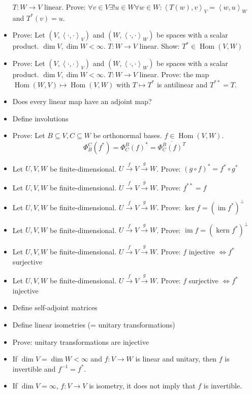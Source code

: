 \documentclass[a4paper]{article}
\newcommand{\ip}[2]{\left\langle#1,#2\right\rangle} %
\DeclareMathOperator{\im}{im}
\DeclareMathOperator{\ke}{kern}
\begin{document}
\begin{itemize}
    $T: W \to V$ linear. Prove: $\forall v \in V \exists! u \in W \forall w \in W: \ip{T(w)}{v}_V = \ip{w}{u}_W$ and $T^*(v) = u$.
  \item Prove: Let $(V, \ip{\cdot}{\cdot}_V)$ and $(W, \ip{\cdot}{\cdot}_W)$ be spaces with a scalar product. $\dim{V}, \dim{W} < \infty$.
    $T: W \to V$ linear. Show: $T^* \in \operatorname{Hom}(V, W)$
  \item Prove: Let $(V, \ip{\cdot}{\cdot}_V)$ and $(W, \ip{\cdot}{\cdot}_W)$ be spaces with a scalar product. $\dim{V}, \dim{W} < \infty$.
    $T: W \to V$ linear. Prove: the map $\operatorname{Hom}(W, V) \mapsto \operatorname{Hom}(V, W)$ with $T \mapsto T^*$ is antilinear and $T^{**} = T$.
  \item Does every linear map have an adjoint map?
  \item Define involutions
  \item Prove: Let $B \subseteq V, C \subseteq W$ be orthonormal bases. $f \in \operatorname{Hom}(V, W)$.
    \[ \Phi_B^C(f^*) = \Phi_C^B(f)^* = \overline{\Phi_C^B(f)^T} \]
  \item Let $U, V, W$ be finite-dimensional. $U \xrightarrow f V \xrightarrow g W$. Prove: $(g \circ f)^* = f^* \circ g^*$
  \item Let $U, V, W$ be finite-dimensional. $U \xrightarrow f V \xrightarrow g W$. Prove: $f^{**} = f$
  \item Let $U, V, W$ be finite-dimensional. $U \xrightarrow f V \xrightarrow g W$. Prove: $\ker{f} = (\im{f^*})^\bot$
  \item Let $U, V, W$ be finite-dimensional. $U \xrightarrow f V \xrightarrow g W$. Prove: $\im{f} = (\ke{f^*})^\bot$
  \item Let $U, V, W$ be finite-dimensional. $U \xrightarrow f V \xrightarrow g W$. Prove: $f$ injective $\iff f^*$ surjective
  \item Let $U, V, W$ be finite-dimensional. $U \xrightarrow f V \xrightarrow g W$. Prove: $f$ surjective $\iff f^*$ injective
  \item Define self-adjoint matrices
  \item Define linear isometries (= unitary transformations)
  \item Prove: unitary transformations are injective
  \item If $\dim{V} = \dim{W} < \infty$ and $f: V \to W$ is linear and unitary, then $f$ is invertible and $f^{-1} = f^*$.
  \item If $\dim{V} = \infty$, $f: V \to V$ is isometry, it does not imply that $f$ is invertible.

\end{itemize}
\end{document}
